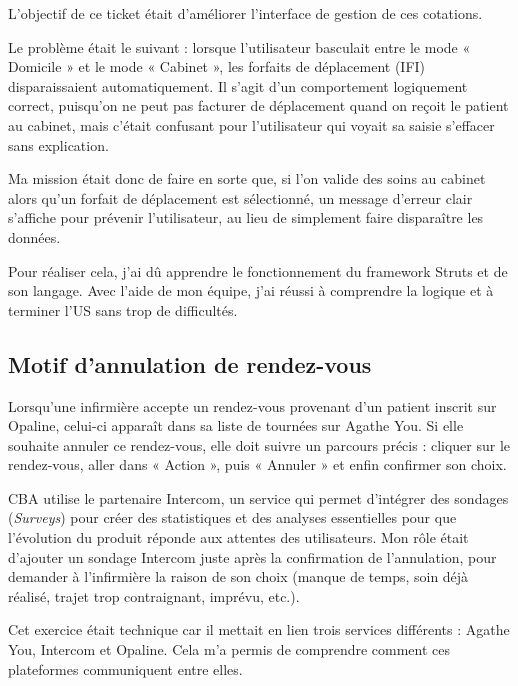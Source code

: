 \documentclass{article}
\begin{document}
L'objectif de ce ticket était d'améliorer l'interface de gestion de ces cotations.

Le problème était le suivant : lorsque l'utilisateur basculait entre le mode « Domicile » et le mode « Cabinet », les forfaits de déplacement (IFI) disparaissaient automatiquement. Il s'agit d'un comportement logiquement correct, puisqu'on ne peut pas facturer de déplacement quand on reçoit le patient au cabinet, mais c'était confusant pour l'utilisateur qui voyait sa saisie s'effacer sans explication.

Ma mission était donc de faire en sorte que, si l'on valide des soins au cabinet alors qu'un forfait de déplacement est sélectionné, un message d'erreur clair s'affiche pour prévenir l'utilisateur, au lieu de simplement faire disparaître les données.

Pour réaliser cela, j'ai dû apprendre le fonctionnement du framework Struts et de son langage. Avec l'aide de mon équipe, j'ai réussi à comprendre la logique et à terminer l'US sans trop de difficultés.


\newpage

\subsection{Motif d'annulation de rendez-vous}

Lorsqu'une infirmière accepte un rendez-vous provenant d'un patient inscrit sur Opaline, celui-ci apparaît dans sa liste de tournées sur Agathe You. Si elle souhaite annuler ce rendez-vous, elle doit suivre un parcours précis : cliquer sur le rendez-vous, aller dans « Action », puis « Annuler » et enfin confirmer son choix.

CBA utilise le partenaire Intercom, un service qui permet d'intégrer des sondages (\textit{Surveys}) pour créer des statistiques et des analyses essentielles pour que l'évolution du produit réponde aux attentes des utilisateurs. Mon rôle était d'ajouter un sondage Intercom juste après la confirmation de l'annulation, pour demander à l'infirmière la raison de son choix (manque de temps, soin déjà réalisé, trajet trop contraignant, imprévu, etc.).

Cet exercice était technique car il mettait en lien trois services différents : Agathe You, Intercom et Opaline. Cela m'a permis de comprendre comment ces plateformes communiquent entre elles.
\end{document}
